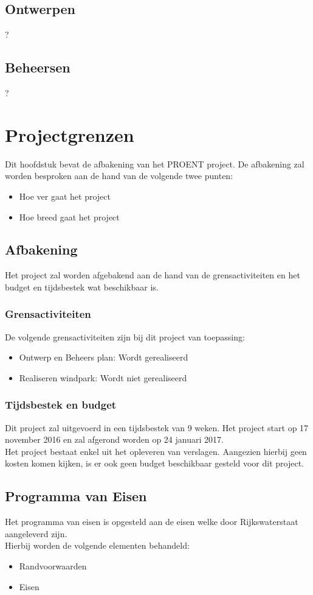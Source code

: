 \documentclass[numbers=endperiod]{scrartcl}
\newcommand{\whitespace}{\vspace*{2 mm} \\}%
\begin{document}
	\subsection{Ontwerpen}
	?
	\subsection{Beheersen}
	?
	
	\section{Projectgrenzen}
	Dit hoofdstuk bevat de afbakening van het PROENT project. De afbakening zal worden besproken aan de hand van de volgende twee punten:
	\begin{itemize}[noitemsep]
		\item Hoe ver gaat het project
		\item Hoe breed gaat het project
	\end{itemize}
	\subsection{Afbakening}
	Het project zal worden afgebakend aan de hand van de grensactiviteiten en het budget en tijdsbestek wat beschikbaar is.
	\subsubsection{Grensactiviteiten}
	De volgende grensactiviteiten zijn bij dit project van toepassing:
	\begin{itemize}
		\item Ontwerp en Beheers plan: Wordt gerealiseerd
		\item Realiseren windpark: Wordt niet gerealiseerd
	\end{itemize}
	\subsubsection{Tijdsbestek en budget}
	Dit project zal uitgevoerd in een tijdsbestek van 9 weken. Het project start op 17 november 2016 en zal afgerond worden op 24 januari 2017.
	\whitespace
	Het project bestaat enkel uit het opleveren van verslagen. Aangezien hierbij geen kosten komen kijken, is er ook geen budget beschikbaar gesteld voor dit project.
	\subsection{Programma van Eisen}
	Het programma van eisen is opgesteld aan de eisen welke door Rijkswaterstaat aangeleverd zijn.
	\whitespace
	Hierbij worden de volgende elementen behandeld:
	\begin{itemize}[noitemsep]
		\item Randvoorwaarden
		\item Eisen
	\end{itemize}
\end{document}
